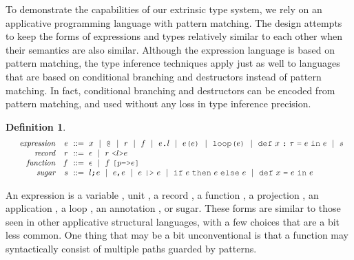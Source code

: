 \documentclass[table,dvipsnames,acmsmall]{acmart}
\theoremstyle{definition}
\newtheorem{definition}{Definition}[section]
\begin{document}

\noindent
To demonstrate the capabilities of our extrinsic type system, 
we rely on an applicative programming language with pattern matching.
The design attempts to keep the forms of expressions and types relatively 
similar to each other when their semantics are also similar. 
Although the expression language is based on pattern matching, 
the type inference techniques apply just as well to languages
that are based on conditional branching and destructors instead of pattern matching.
In fact, conditional branching and destructors can be encoded from pattern matching,
and used without any loss in type inference precision.

\begin{definition}
  \label{def:expression}
  \nopad 
  \small
  \[\begin{array}[t]{rr@{}l}
    \com{expression} &
    \nonterm{e} 
    & 
    \is 
    \begin{array}[t]{@{}l}
      x \sep 
      \J{@} \sep
      r \sep
      f \sep 
      e\J{.}l \sep
      e\J{(}e\J{)} \sep
      \J{loop(}e\J{)} \sep
      \J{def}\ x\ \J{:}\ \tau\ \J{=}\ e\ \J{in}\ e \sep
      s
    \end{array}
    \\
    \com{record} &
    \nonterm{r} & \is \epsilon \sep r\ \J{<}l\J{>}e 
    \\
    \com{function} &
    \nonterm{f} & \is \epsilon \sep f\ \J{[}p\J{=>}e \J{]}
    \\
    \com{sugar} &
    \nonterm{s} 
    & 
    \is 
    \begin{array}[t]{@{}l}
      l \J{;} e \sep
      e \J{,} e \sep
      e\ \J{|>}\ e \sep
      \J{if}\ e\ \J{then}\ e\ \J{else}\ e \sep
      \J{def}\ x\ \J{=}\ e\ \J{in}\ e
    \end{array}
  \end{array}\]
\end{definition}

\noindent
An expression is a variable , unit ,
a record , a function , 
a projection , an application , 
a loop ,
an annotation ,
or sugar.
These forms are similar to those seen in other applicative structural languages,
with a few choices that are a bit less common. One thing that may be
a bit unconventional is that a function may syntactically consist of 
multiple paths guarded by patterns.  
\end{document}
